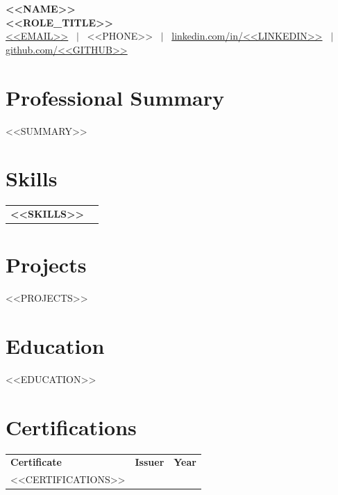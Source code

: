 \documentclass[a4paper,10pt]{article}
\begin{document}
\pagestyle{empty}

\begin{center}
{\LARGE \textbf{<<NAME>>}}\\[3pt]
\textbf{ <<ROLE_TITLE>> }\\[3pt]
\href{mailto:<<EMAIL>>}{<<EMAIL>>}
~$|$~
<<PHONE>>
~$|$~
\href{https://linkedin.com/in/<<LINKEDIN>>}{linkedin.com/in/<<LINKEDIN>>}
~$|$~
\href{https://github.com/<<GITHUB>>}{github.com/<<GITHUB>>}
\end{center}

\vspace{-5pt}

\section*{Professional Summary}
<<SUMMARY>>

\section*{Skills}

\renewcommand{\arraystretch}{1.0}
\begin{tabular}{@{} >{\bfseries}p{3.8cm} p{13cm} @{} }
<<SKILLS>>
\end{tabular}

\section*{Projects}

<<PROJECTS>>

\section*{Education}
<<EDUCATION>>

\section*{Certifications}

\renewcommand{\arraystretch}{1.0}
\begin{tabular}{@{} p{8.2cm} >{\centering\arraybackslash}p{7.0cm} >{\raggedleft\arraybackslash}p{2.5cm} @{} }
\textbf{Certificate} & \textbf{Issuer} & \textbf{Year} \\[1pt]
<<CERTIFICATIONS>>
\end{tabular}
\end{document}
